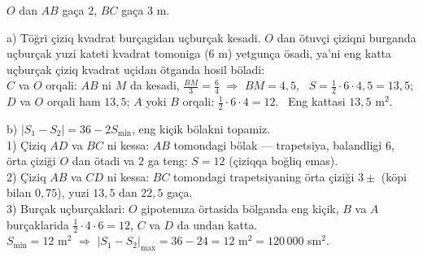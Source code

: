 \newpage
{}
$O$ dan $AB$ gaça $2$, $BC$ gaça $3$ m.

a) Töğri çiziq kvadrat burçagidan uçburçak kesadi. $O$ dan ötuvçi çiziqni burganda uçburçak yuzi kateti kvadrat tomoniga ($6$ m) yetgunça ösadi, ya'ni eng katta uçburçak çiziq kvadrat uçidan ötganda hosil böladi:\\
$C$ va $O$ orqali: $AB$ ni $M$ da kesadi, $\frac{BM}{3}=\frac{6}{4}$ $\Rightarrow$ $BM=4{,}5$, \ $S=\frac12\cdot6\cdot4{,}5=13{,}5$;\\
$D$ va $O$ orqali ham $13{,}5$; $A$ yoki $B$ orqali: $\frac12\cdot6\cdot4=12$. \ Eng kattasi $13{,}5$ m$^2$.

b) $|S_1-S_2|=36-2S_{\min}$, eng kiçik bölakni topamiz.\\
1) Çiziq $AD$ va $BC$ ni kessa: $AB$ tomondagi bölak — trapetsiya, balandligi $6$, örta çiziği $O$ dan ötadi va $2$ ga teng: $S=12$ (çiziqqa boğliq emas).\\
2) Çiziq $AB$ va $CD$ ni kessa: $BC$ tomondagi trapetsiyaning örta çiziği $3\pm$ (köpi bilan $0{,}75$), yuzi $13{,}5$ dan $22{,}5$ gaça.\\
3) Burçak uçburçaklari: $O$ gipotenuza örtasida bölganda eng kiçik, $B$ va $A$ burçaklarida $\frac12\cdot4\cdot6=12$, $C$ va $D$ da undan katta.\\
$S_{\min}=12$ m$^2$ $\Rightarrow$ $|S_1-S_2|_{\max}=36-24=12$ m$^2=120\,000$ sm$^2$.

\ShowJavoblar


